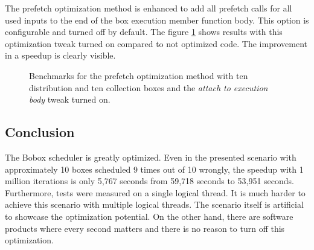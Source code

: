 The prefetch optimization method is enhanced to add all prefetch calls for all used inputs to the end of the box execution member function body. This option is configurable and turned off by default. The figure \ref{prefetch-bench-attach} shows results with this optimization tweak turned on compared to not optimized code. The improvement in a speedup is clearly visible.

\begin{figure}[h!]
\vspace{.5cm}
\centering
{}
\caption{Benchmarks for the prefetch optimization method with ten distribution and ten collection boxes and the \textit{attach to execution body} tweak turned on.}
\label{prefetch-bench-attach}
\end{figure}

\subsection{Conclusion}
The Bobox scheduler is greatly optimized. Even in the presented scenario with approximately 10 boxes scheduled 9 times out of 10 wrongly, the speedup with 1 million iterations is only 5,767 seconds from 59,718 seconds to 53,951 seconds. Furthermore, tests were measured on a single logical thread. It is much harder to achieve this scenario with multiple logical threads. The scenario itself is artificial to showcase the optimization potential. On the other hand, there are software products where every second matters and there is no reason to turn off this optimization.

